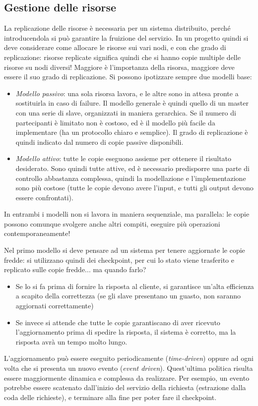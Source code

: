 \subsection{Gestione delle risorse}
La replicazione delle risorse è necessaria per un sistema distribuito, perché 
introducendola si può garantire la
fruizione del servizio. In un progetto quindi si deve considerare come allocare 
le risorse sui vari nodi, e con che
grado di replicazione: risorse replicate significa quindi che si hanno copie 
multiple delle risorse su nodi diversi!
Maggiore è l'importanza della risorsa, maggiore deve essere il suo grado di 
replicazione.
Si possono ipotizzare sempre due modelli base:
\begin{itemize}
 \item \textit{Modello passivo}: una sola risorsa lavora, e le altre sono in 
attesa pronte a sostituirla in caso di
 failure. Il modello generale è quindi quello di un master con una serie di 
slave, organizzati in maniera gerarchica.
 Se il numero di partecipanti è limitato non è costoso, ed è il modello più 
facile da implementare (ha un protocollo
 chiaro e semplice). Il grado di replicazione è quindi indicato dal numero di 
copie passive disponibili.
 \item \textit{Modello attivo}: tutte le copie eseguono assieme per ottenere il 
risultato desiderato. Sono quindi tutte
 attive, ed è necessario predisporre una parte di controllo abbastanza 
complessa, quindi la modellazione e
 l'implementazione sono più costose (tutte le copie devono avere l'input, e 
tutti gli output devono essere confrontati).
\end{itemize}
In entrambi i modelli non si lavora in maniera sequenziale, ma parallela: le 
copie possono comunque svolgere anche
altri compiti, eseguire più operazioni contemporaneamente!

Nel primo modello si deve pensare ad un sistema per tenere aggiornate le copie 
fredde: si utilizzano quindi dei
checkpoint, per cui lo stato viene trasferito e replicato sulle copie fredde... 
ma quando farlo?
\begin{itemize}
 \item Se lo si fa prima di fornire la risposta al cliente, si garantisce 
un'alta efficienza a scapito della
 correttezza (se gli slave presentano un guasto, non saranno aggiornati 
correttamente)
 \item Se invece si attende che tutte le copie garantiscano di aver ricevuto 
l'aggiornamento prima di spedire la
 risposta, il sistema è corretto, ma la risposta avrà un tempo molto lungo.
\end{itemize}
L'aggiornamento può essere eseguito periodicamente (\textit{time-driven}) 
oppure ad ogni volta che si presenta un nuovo
evento (\textit{event driven}). Quest'ultima politica risulta essere 
maggiormente dinamica e complessa da realizzare.
Per esempio, un evento potrebbe essere scatenato dall'inizio del servizio della 
richiesta (estrazione dalla coda delle
richieste), e terminare alla fine per poter fare il checkpoint.


